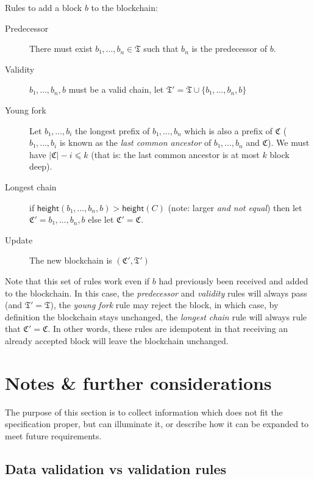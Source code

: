 \documentclass{article}
\newcommand{\length}[1]{|#1|}
\newcommand{\height}[1]{\mathsf{height}(#1)}
\begin{document}
Rules to add a block $b$ to the blockchain:

\begin{description}
\item[Predecessor] There must exist $b₁,…,b_n∈ \mathfrak{T}$ such that
  $b_n$ is the predecessor of $b$.
\item[Validity] $b₁,…,b_n,b$ must be a valid chain, let $\mathfrak{T}'
  = \mathfrak{T}∪\{b₁,…,b_n,b\}$
\item[Young fork] Let $b₁,…,b_i$ the longest prefix of $b₁,…,b_n$
  which is also a prefix of $\mathfrak{C}$ ($b₁,…,b_i$ is known as the
  \emph{last common ancestor} of $b₁,…,b_n$ and $\mathfrak{C}$). We
  must have $\length{\mathfrak{C}} - i ⩽ k$  (that is: the last common
  ancestor is at most $k$ block deep).
\item[Longest chain] if $\height{b₁,…,b_n,b} > \height{C}$ (note:
  larger \emph{and not equal}) then let $\mathfrak{C}'=b₁,…,b_n,b$
  else let $\mathfrak{C}'=\mathfrak{C}$.
\item[Update] The new blockchain is $(\mathfrak{C}', \mathfrak{T}')$
\end{description}

Note that this set of rules work even if $b$ had previously been
received and added to the blockchain. In this case, the
\emph{predecessor} and \emph{validity} rules will always pass (and
$\mathfrak{T}'=\mathfrak{T}$), the \emph{young fork} rule may reject
the block, in which case, by definition the blockchain stays
unchanged, the \emph{longest chain} rule will always rule that
$\mathfrak{C'}=\mathfrak{C}$. In other words, these rules are
idempotent in that receiving an already accepted block will leave the
blockchain unchanged.

\appendix

\section{Notes \& further considerations}
\label{sec:notes}

The purpose of this section is to collect information which does not
fit the specification proper, but can illuminate it, or describe how
it can be expanded to meet future requirements.

\subsection{Data validation vs validation rules}
\label{sec:data-validation-vs}
\end{document}
